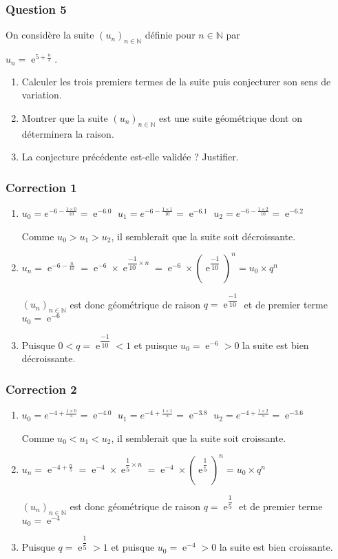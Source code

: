 \documentclass[15pt, mathserif]{beamer}
\DeclareMathOperator{\e}{e}
\newcommand{\N}{\mathbb{N}}			%
\newcommand{\st}[1]{$(#1_n)_{n \in \N}$}
\begin{document}
\begin{frame} 
	\frametitle{Question 5}
On considère la suite \st{u} définie pour $n \in \N$ par 
 
 \hfil$u_n=\e^{5+\frac{n}{2}}.$
 \begin{enumerate} 
 	 \item Calculer les trois premiers termes de la suite puis conjecturer son sens de variation. 
 	 \item Montrer que la suite \st{u} est une suite géométrique dont on déterminera la raison. 
 	 \item La conjecture précédente est-elle validée ? Justifier. 
 \end{enumerate}\end{frame}


\begin{frame}
\vspace{-10mm}
	\frametitle{Correction 1}

 \begin{enumerate} 
 	 \item  \hfil$u_0=e^{-6-\frac{1\times 0}{10}}=\e^{-6.0}$ \hfil$u_1=e^{-6-\frac{1\times 1}{10}}=\e^{-6.1} $ \hfil $u_2=e^{-6-\frac{1\times 2}{10}}=\e^{-6.2}$
 
 Comme $u_0>u_1>u_2$, il semblerait que la suite soit décroissante.
 	 \item $u_n=\e^{-6-\frac{n}{10}}=\e^{-6} \times \e^{\dfrac{-1}{10}\times n} =\e^{-6} \times \left( \e^{\dfrac{-1}{10}} \right)^n=u_0 \times q^n$ 
 
 \st{u} est donc géométrique de raison $q= \e^{\dfrac{-1}{10}}$ et de premier terme $u_0=\e^{-6}$ 
 	 \item Puisque $0<q= \e^{\dfrac{-1}{10}}<1$ et puisque $u_0=\e^{-6}>0$ la suite est bien décroissante.
 \end{enumerate}\end{frame}


\begin{frame}
\vspace{-10mm}
	\frametitle{Correction 2}

 \begin{enumerate} 
 	 \item  \hfil$u_0=e^{-4+\frac{1\times 0}{5}}=\e^{-4.0}$ \hfil$u_1=e^{-4+\frac{1\times 1}{5}}=\e^{-3.8} $ \hfil $u_2=e^{-4+\frac{1\times 2}{5}}=\e^{-3.6}$
 
 Comme $u_0<u_1<u_2$, il semblerait que la suite soit croissante.
 	 \item $u_n=\e^{-4+\frac{n}{5}}=\e^{-4} \times \e^{\dfrac{1}{5}\times n} =\e^{-4} \times \left( \e^{\dfrac{1}{5}} \right)^n=u_0 \times q^n$ 
 
 \st{u} est donc géométrique de raison $q= \e^{\dfrac{1}{5}}$ et de premier terme $u_0=\e^{-4}$ 
 	 \item Puisque $q= \e^{\dfrac{1}{5}}>1$ et puisque $u_0=\e^{-4}>0$ la suite est bien croissante.
 \end{enumerate}\end{frame}
\end{document}
